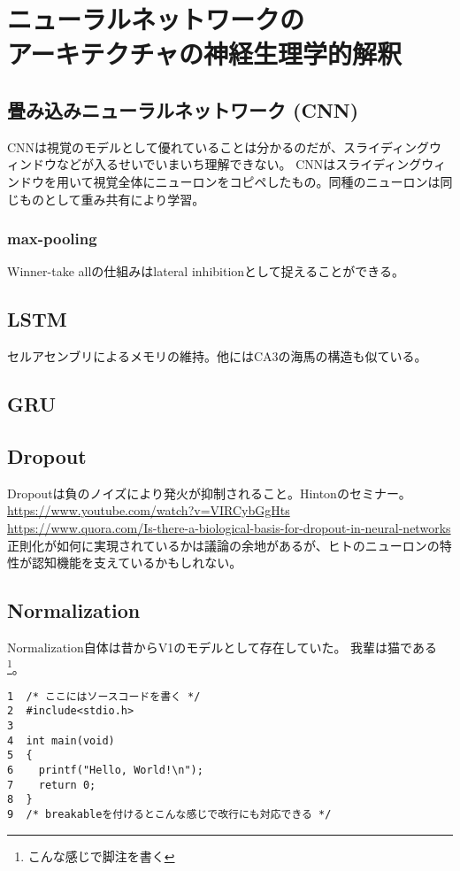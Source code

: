 \documentclass[11pt,dvipdfmx,b5paper,oneside]{jsbook}
\begin{document}
\chapter[ニューラルネットワークのアーキテクチャの神経生理学的解釈]{ニューラルネットワークの\\アーキテクチャの神経生理学的解釈}
\section{畳み込みニューラルネットワーク (CNN)}
CNNは視覚のモデルとして優れていることは分かるのだが、スライディングウィンドウなどが入るせいでいまいち理解できない。
CNNはスライディングウィンドウを用いて視覚全体にニューロンをコピペしたもの。同種のニューロンは同じものとして重み共有により学習。
\subsection{max-pooling}
Winner-take allの仕組みはlateral inhibitionとして捉えることができる。
\section{LSTM}
セルアセンブリによるメモリの維持。他にはCA3の海馬の構造も似ている。

\section{GRU}

\section{Dropout}
Dropoutは負のノイズにより発火が抑制されること。Hintonのセミナー。\\
\url{https://www.youtube.com/watch?v=VIRCybGgHts}\\
\url{https://www.quora.com/Is-there-a-biological-basis-for-dropout-in-neural-networks}
正則化が如何に実現されているかは議論の余地があるが、ヒトのニューロンの特性が認知機能を支えているかもしれない。

\section{Normalization}
Normalization自体は昔からV1のモデルとして存在していた。
我輩は猫である\footnote{こんな感じで脚注を書く}。


\begin{tcolorbox}[breakable]
\begin{verbatim}
1  /* ここにはソースコードを書く */
2  #include<stdio.h>
3
4  int main(void)
5  {
6    printf("Hello, World!\n");
7    return 0;
8  }
9  /* breakableを付けるとこんな感じで改行にも対応できる */
\end{verbatim}
\end{tcolorbox}
\end{document}
